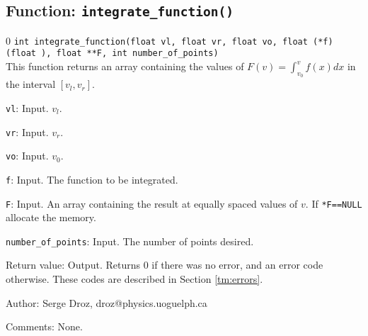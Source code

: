 \subsection{Function: {\tt integrate\_function()}}
\setcounter{equation}0
{\tt int integrate\_function(float vl, float vr, float vo, float (*f)(float ),
                        float **F, int number\_of\_points)}\\
This function returns an array containing the values 
of $F(v) = \int_{v_0}^v f(x) dx$ in the interval $[v_l, v_r]$.
\begin{description}
\item{{\tt vl}}: Input. $v_l$.
\item{{\tt vr}}: Input. $v_r$.
\item{{\tt vo}}: Input. $v_0$.
\item{{\tt f}}: Input. The function to be integrated.
\item{{\tt F}}: Input. An array containing the result at equally spaced
values of $v$. If {\tt **F==NULL} allocate the memory.
\item{{\tt number\_of\_points}}: Input. The number of points desired.
\item{Return value}: Output. Returns $0$ if there was
   no error, and an error code otherwise. 
   These codes are described in Section \ref{tm:errors}.
\end{description}
\begin{description}
\item{Author:} Serge Droz, droz@physics.uoguelph.ca
\item{Comments:} None.
\end{description}
\clearpage
%
%

